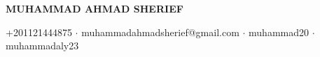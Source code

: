 \begin{center}
    \textcolor{themecolor}{\fontsize{12pt}{10}\textbf{MUHAMMAD AHMAD SHERIEF}}
    \vspace{1.2mm}

    {\faMobile} +201121444875 $\cdot$
    \href{mailto:muhammadahmadsherief@gmail.com}{\faEnvelope} muhammadahmadsherief@gmail.com $\cdot$
    \href{https://github.com/muhammad20/}{\faGithub} muhammad20 $\cdot$
    \href{https://www.linkedin.com/in/muhammadaly23/}{\faLinkedinSquare} muhammadaly23

\end{center}